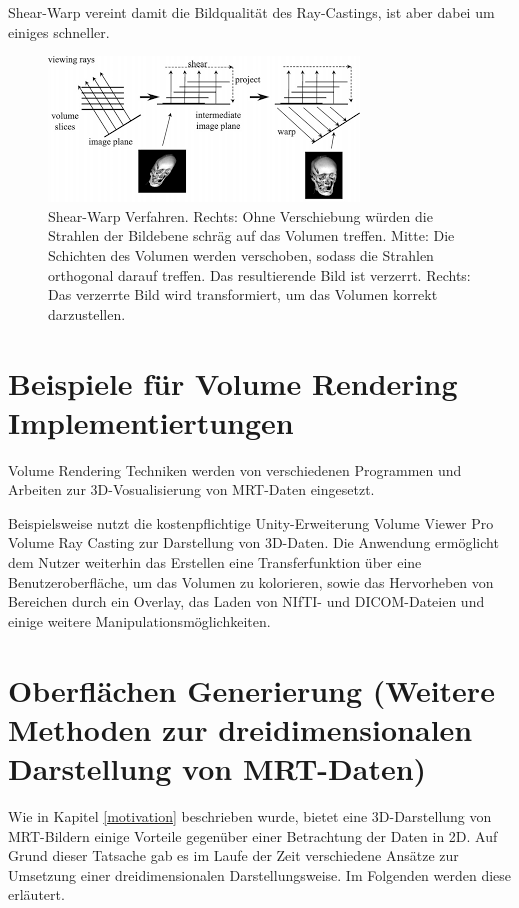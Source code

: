 Shear-Warp vereint damit die Bildqualität des Ray-Castings, ist aber dabei um einiges schneller.

\begin{figure}
	\centering
	\includegraphics[width=0.7\linewidth]{images/shearwarp.png}
	\caption{Shear-Warp Verfahren. Rechts: Ohne Verschiebung würden die Strahlen der Bildebene schräg auf das Volumen treffen. Mitte: Die Schichten des Volumen werden verschoben, sodass die Strahlen orthogonal darauf treffen. Das resultierende Bild ist verzerrt. Rechts: Das verzerrte Bild wird transformiert, um das Volumen korrekt darzustellen.}
	\label{img:shearwarp}
\end{figure}

\section{Beispiele für Volume Rendering Implementiertungen}

Volume Rendering Techniken werden von verschiedenen Programmen und Arbeiten zur 3D-Vosualisierung von MRT-Daten eingesetzt.

Beispielsweise nutzt die kostenpflichtige Unity-Erweiterung Volume Viewer Pro Volume Ray Casting zur Darstellung von 3D-Daten. Die Anwendung ermöglicht dem Nutzer weiterhin das Erstellen eine Transferfunktion über eine Benutzeroberfläche, um das Volumen zu kolorieren, sowie das Hervorheben von Bereichen durch ein Overlay, das Laden von NIfTI- und DICOM-Dateien und einige weitere Manipulationsmöglichkeiten. 
\cite{volumeViewerPro}


\section{Oberflächen Generierung (Weitere Methoden zur dreidimensionalen Darstellung von MRT-Daten)}		 %
Wie in Kapitel \ref{motivation} beschrieben wurde, bietet eine 3D-Darstellung von MRT-Bildern einige Vorteile gegenüber einer Betrachtung der Daten in 2D. 
Auf Grund dieser Tatsache gab es im Laufe der Zeit verschiedene Ansätze zur Umsetzung einer dreidimensionalen Darstellungsweise. 
Im Folgenden werden diese erläutert. 

